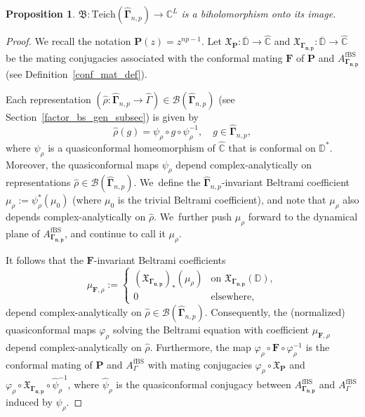 \documentclass[JEP,XML,SOM,Unicode,NoFloatCountersInSection,published]{cedram}
\newtheorem{proposition}[lemma]{Proposition}
\theoremstyle{definition}
\theoremstyle{remark}
\newcommand{\C}{\mathbb{C}}
\newcommand{\D}{\mathbb{D}}
\let\phi\varphi
\begin{document}
\begin{proposition}\label{bers_embedding_corr_prop}
$\mathfrak{B}:\mathrm{Teich}(\widehat{\pmb{\Gamma}}_{n,p})\to \C^{L}$ is a biholomorphism onto its image.
\end{proposition}
\begin{proof}
We recall the notation $\pmb{P}(z)=z^{np-1}$. Let $\mathfrak{X}_{\pmb{P}}:\overline{\D}\to\widehat{\C}$ and $\mathfrak{X}_{\pmb{\Gamma_{n,p}}}:\overline{\D}\to\widehat{\C}$ be the mating conjugacies associated with the conformal mating $\pmb{F}$ of $\pmb{P}$ and $A_{\pmb{\Gamma_{n,p}}}^{\mathrm{fBS}}$ (see Definition~\ref{conf_mat_def}).

Each representation $(\widehat{\rho}:\widehat{\pmb{\Gamma}}_{n,p}\to\widehat{\Gamma})\in\mathcal{B}(\widehat{\pmb{\Gamma}}_{n,p})$ (see Section~\ref{factor_bs_gen_subsec}) is given by
\[
\widehat{\rho}(g)=\psi_\rho\circ g\circ\psi_\rho^{-1},\quad g\in\widehat{\pmb{\Gamma}}_{n,p},
\]
where $\psi_\rho$ is a quasiconformal homeomorphism of $\widehat{\C}$ that is conformal on $\D^*$.
Moreover, the quasiconformal maps $\psi_\rho$ depend complex-analytically on representations $\widehat{\rho}\in\mathcal{B}(\widehat{\pmb{\Gamma}}_{n,p})$. We~define the $\widehat{\pmb{\Gamma}}_{n,p}$-invariant Beltrami coefficient $\mu_\rho:=\psi_\rho^*(\mu_0)$ (where $\mu_0$ is the trivial Beltrami coefficient), and note that $\mu_\rho$ also depends complex-analytically on $\widehat{\rho}$. We~further push $\mu_\rho$ forward to the dynamical plane of $A_{\pmb{\Gamma_{n,p}}}^{\mathrm{fBS}}$, and continue to call it $\mu_\rho$.

It follows that the $\pmb{F}$-invariant Beltrami coefficients
\[
\mu_{\pmb{F},\rho}:=\begin{cases}
(\mathfrak{X}_{\pmb{\Gamma_{n,p}}})_*(\mu_\rho)& \text{on } \mathfrak{X}_{\pmb{\Gamma_{n,p}}}(\D),\\
0&\text{elsewhere},
\end{cases}
\]
depend complex-analytically on $\widehat{\rho}\in\mathcal{B}(\widehat{\pmb{\Gamma}}_{n,p})$. Consequently, the (normalized) quasiconformal maps $\phi_\rho$ solving the Beltrami equation with coefficient $\mu_{\pmb{F},\rho}$ depend complex-analytically on $\widehat{\rho}$. Furthermore, the map $\phi_\rho\circ\pmb{F}\circ\phi_\rho^{-1}$ is the conformal mating of $\pmb{P}$ and $A_{\Gamma}^{\mathrm{fBS}}$ with mating conjugacies $\phi_\rho\circ\mathfrak{X}_{\pmb{P}}$ and $\phi_\rho\circ\mathfrak{X}_{\pmb{\Gamma_{n,p}}}\circ\widehat{\psi}_\rho^{-1}$, where $\widehat{\psi}_\rho$ is the quasiconformal conjugacy between $A_{\pmb{\Gamma_{n,p}}}^{\mathrm{fBS}}$ and $A_{\Gamma}^{\mathrm{fBS}}$ induced by $\psi_\rho$.


\end{proof}
\end{document}
